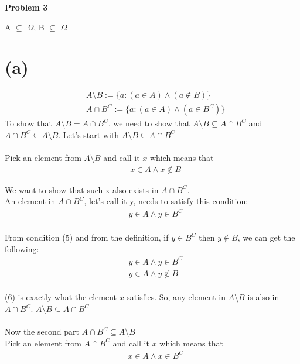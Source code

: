 \documentclass{article}
\begin{document}
\begin{flushleft}
   \textbf{Problem 3}
\end{flushleft}

A $\subseteq$ $\Omega$, B $\subseteq$ $\Omega$

\section*{(a)}
\begin{align*}
    & A \setminus B := \{a: (a \in A) \land (a \notin B)\} \\
    & A \cap B^C := \{a: (a \in A) \land (a \in B^C)\}
\end{align*}
To show that $A \setminus B = A \cap B^C$, we need to show that $A \setminus B \subseteq A \cap B^C$ and $A \cap B^C \subseteq A \setminus B$.
Let's start with $A \setminus B \subseteq A \cap B^C$ \\
\\
Pick an element from $A \setminus B$ and call it $x$ which means that 
\begin{align}
   & x \in A \land x \notin B
\end{align}

We want to show that such x also exists
in $A \cap B^C$. \\
An element in $A \cap B^C$, let's call it y,  needs to satisfy this condition:
\begin{align}
   & y \in A \land y \in B^C
\end{align}
\\
From condition (5) and from the definition, if $y \in B^C$ then $y \notin B$, we can get the following:
\begin{align}
   & y \in A \land y \in B^C \tag*{(5)} \\
   & y \in A \land y \notin B \tag*{(6)}
\end{align}
\\
(6) is exactly what the element $x$ satisfies. So, any element in $A \setminus B$ is also in $A \cap B^C$. $A \setminus B \subseteq A \cap B^C$ 
\\
\\
Now the second part $A \cap B^C \subseteq A \setminus B$ \\
Pick an element from $A \cap B^C$ and call it $x$ which means that
\begin{align}
    & x \in A \land x \in B^C
\end{align}
\end{document}
